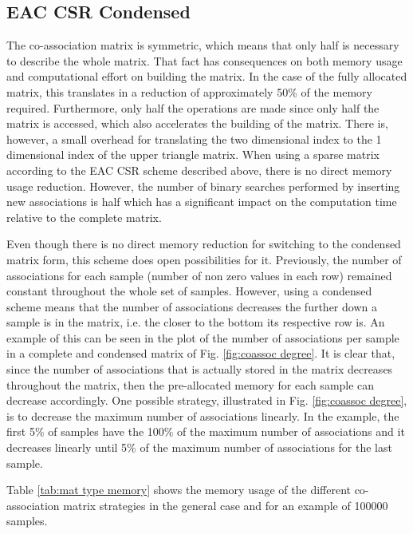 \subsection{EAC CSR Condensed}

The co-association matrix is symmetric, which means that only half is necessary to describe the whole matrix.
That fact has consequences on both memory usage and computational effort on building the matrix.
In the case of the fully allocated matrix, this translates in a reduction of approximately 50\% of the memory required.
Furthermore, only half the operations are made since only half the matrix is accessed, which also accelerates the building of the matrix.
There is, however, a small overhead for translating the two dimensional index to the 1 dimensional index of the upper triangle matrix.
When using a sparse matrix according to the EAC CSR scheme described above, there is no direct memory usage reduction.
However, the number of binary searches performed by inserting new associations is half which has a significant impact on the computation time relative to the complete matrix.

Even though there is no direct memory reduction for switching to the condensed matrix form, this scheme does open possibilities for it.
Previously, the number of associations for each sample (number of non zero values in each row) remained constant throughout the whole set of samples.
However, using a condensed scheme means that the number of associations decreases the further down a sample is in the matrix, i.e. the closer to the bottom its respective row is.
An example of this can be seen in the plot of the number of associations per sample in a complete and condensed matrix of Fig. \ref{fig:coassoc degree}.
It is clear that, since the number of associations that is actually stored in the matrix decreases throughout the matrix, then the pre-allocated memory for each sample can decrease accordingly.
One possible strategy, illustrated in Fig. \ref{fig:coassoc degree}, is to decrease the maximum number of associations linearly.
In the example, the first 5\% of samples have the 100\% of the maximum number of associations and it decreases linearly until 5\% of the maximum number of associations for the last sample.

Table \ref{tab:mat type memory} shows the memory usage of the different co-association matrix strategies in the general case and for an example of 100000 samples.

